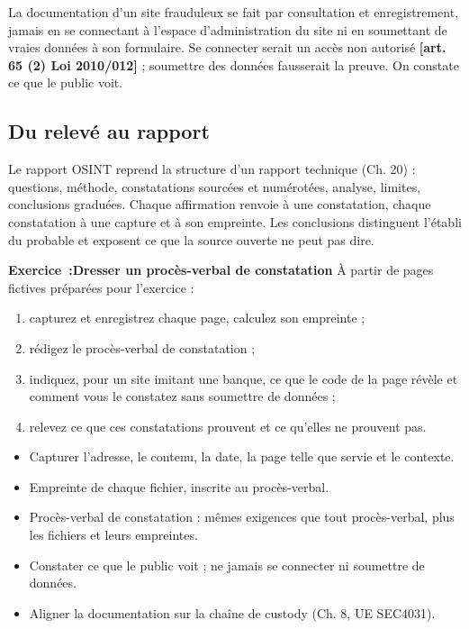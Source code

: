 \begin{boxalert}
La documentation d'un site frauduleux se fait par consultation et enregistrement, jamais en se connectant à l'espace d'administration du site ni en soumettant de vraies données à son formulaire. Se connecter serait un accès non autorisé \textbf{[art. 65 (2) Loi 2010/012]} ; soumettre des données fausserait la preuve. On constate ce que le public voit.
\end{boxalert}

\subsection{Du relevé au rapport}

Le rapport OSINT reprend la structure d'un rapport technique (Ch. 20) : questions, méthode, constatations sourcées et numérotées, analyse, limites, conclusions graduées. Chaque affirmation renvoie à une constatation, chaque constatation à une capture et à son empreinte. Les conclusions distinguent l'établi du probable et exposent ce que la source ouverte ne peut pas dire.

\begin{boxexo}
\textbf{Exercice~:Dresser un procès-verbal de constatation}
À partir de pages fictives préparées pour l'exercice :
\begin{enumerate}
\item capturez et enregistrez chaque page, calculez son empreinte ;
\item rédigez le procès-verbal de constatation ;
\item indiquez, pour un site imitant une banque, ce que le code de la page révèle et comment vous le constatez sans soumettre de données ;
\item relevez ce que ces constatations prouvent et ce qu'elles ne prouvent pas.
\end{enumerate}
\end{boxexo}

\begin{boxresume}
\begin{itemize}
\item Capturer l'adresse, le contenu, la date, la page telle que servie et le contexte.
\item Empreinte de chaque fichier, inscrite au procès-verbal.
\item Procès-verbal de constatation : mêmes exigences que tout procès-verbal, plus les fichiers et leurs empreintes.
\item Constater ce que le public voit ; ne jamais se connecter ni soumettre de données.
\item Aligner la documentation sur la chaîne de custody (Ch. 8, UE SEC4031).
\end{itemize}
\end{boxresume}

